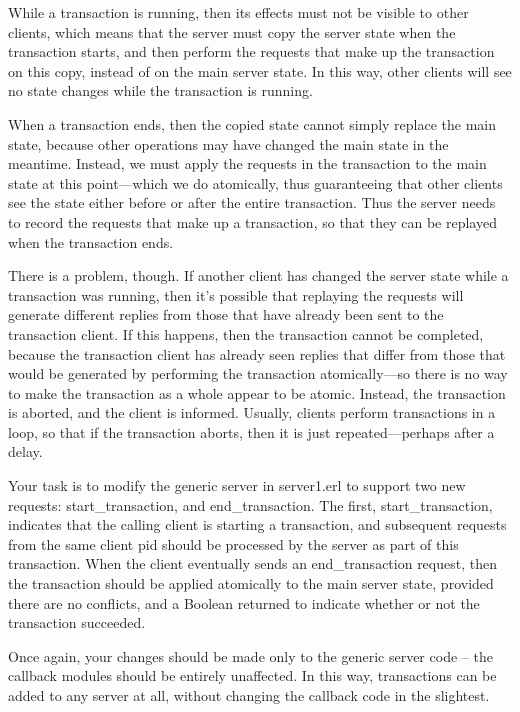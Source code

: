 \documentclass{article}
\begin{document}
While a transaction is running, then its effects must not be visible
to other clients, which means that the server must copy the server
state when the transaction starts, and then perform the requests that
make up the transaction on this copy, instead of on the main server
state. In this way, other clients will see no state changes while the
transaction is running.


When a transaction ends, then the copied state cannot simply replace
the main state, because other operations may have changed the main
state in the meantime. Instead, we must apply the requests in the
transaction to the main state at this point—which we do atomically,
thus guaranteeing that other clients see the state either before or
after the entire transaction.  Thus the server needs to record the
requests that make up a transaction, so that they can be replayed when
the transaction ends.

There is a problem, though. If another client has changed the server
state while a transaction was running, then it’s possible that
replaying the requests will generate different replies from those that
have already been sent to the transaction client. If this happens,
then the transaction cannot be completed, because the transaction
client has already seen replies that differ from those that would be
generated by performing the transaction atomically—so there is no way
to make the transaction as a whole appear to be atomic. Instead, the
transaction is aborted, and the client is informed. Usually, clients
perform transactions in a loop, so that if the transaction aborts,
then it is just repeated—perhaps after a delay.

Your task is to modify the generic server in \textsf{server1.erl} to support
two new requests: \textsf{start\_transaction}, and
\textsf{end\_transaction}. The first, \textsf{start\_transaction},
indicates that the calling client is starting a transaction, and
subsequent requests from the same client pid should be processed by
the server as part of this transaction. When the client eventually
sends an \textsf{end\_transaction} request, then the transaction
should be applied atomically to the main server state, provided there
are no conflicts, and a Boolean returned to indicate whether or not
the transaction succeeded.

Once again, your changes should be made only to the generic server
code -- the callback modules should be entirely unaffected. In this way,
transactions can be added to any server at all, without changing the
callback code in the slightest.
\end{document}
